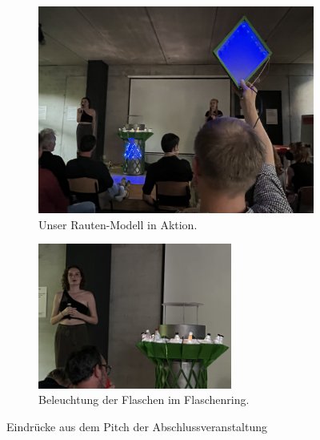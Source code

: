     \begin{figure}[H]
        \begin{subfigure}[b]{0.5\textwidth}
            \centering\includegraphics[width=\textwidth]{media/04_result/pic_communication.jpg}
            \caption{Unser Rauten-Modell in Aktion.}
            \label{fig:pic_gerippte_2}
        \end{subfigure}\quad
        \begin{subfigure}[b]{0.5\textwidth}
            \centering\includegraphics[width=0.7\textwidth]{media/04_result/pic_presentation_bottles.jpg}
            \caption{Beleuchtung der Flaschen im Flaschenring.}
            \label{fig:pic_gerippte_3}
        \end{subfigure}
        \caption{Eindrücke aus dem Pitch der Abschlussveranstaltung}
    \end{figure}

